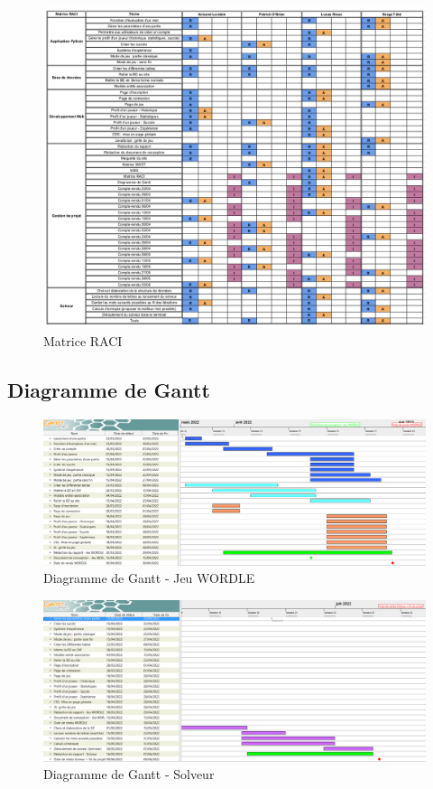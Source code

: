 \begin{figure}[h!]
    \centering
    \includegraphics[width=16cm]{figures/RACI.png}
    \caption{Matrice RACI}
\end{figure}

\newpage

\subsection*{Diagramme de Gantt}

\begin{figure}[h!]
    \centering
    \includegraphics[width=18cm]{figures/gantt_jeu_wordle.PNG}
    \caption{Diagramme de Gantt - Jeu WORDLE}
\end{figure}

\begin{figure}[h!]
    \centering
    \includegraphics[width=18cm]{figures/gantt_solveur.PNG}
    \caption{Diagramme de Gantt - Solveur}
\end{figure}
